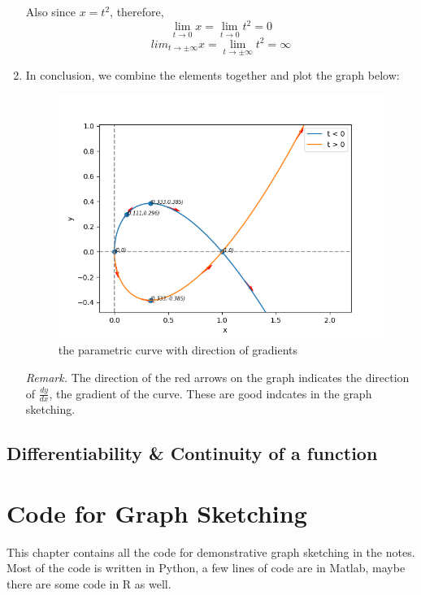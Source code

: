 \documentclass[12pt]{report}
\begin{document}
\begin{enumerate}
    Also since $x = t^2$, therefore,
    $$
    \lim_{t \to 0} x = \lim_{t \to 0} t^2 = 0
    $$ $$
    lim_{t \to \pm \infty} x = \lim_{t \to \pm \infty} t^2 = \infty
    $$

    \item In conclusion, we combine the elements together and plot the graph below:
    
    \begin{figure}[h]
        \centering
        \includegraphics[scale = 0.6]{parametric-curve-sketching.png}
        \caption{the parametric curve with direction of gradients}    
    \end{figure}

    \emph{Remark.} The direction of the red arrows on the graph indicates the direction of $\frac{dy}{dx}$, the gradient of the curve. These are good indcates in the graph sketching.
\end{enumerate}
    
\section{Differentiability \& Continuity of a function}


\appendix

\chapter{Code for Graph Sketching}
This chapter contains all the code for demonstrative graph sketching in the notes.
Most of the code is written in Python, a few lines of code are in Matlab, maybe there are some code in R as well.
\end{document}
